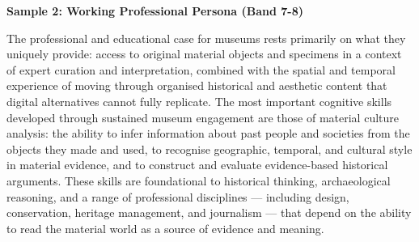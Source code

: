 \textbf{Sample 2: Working Professional Persona (Band 7-8)}

The professional and educational case for museums rests primarily on what they uniquely provide: access to original material objects and specimens in a context of expert curation and interpretation, combined with the spatial and temporal experience of moving through organised historical and aesthetic content that digital alternatives cannot fully replicate. The most important cognitive skills developed through sustained museum engagement are those of material culture analysis: the ability to infer information about past people and societies from the objects they made and used, to recognise geographic, temporal, and cultural style in material evidence, and to construct and evaluate evidence-based historical arguments. These skills are foundational to historical thinking, archaeological reasoning, and a range of professional disciplines — including design, conservation, heritage management, and journalism — that depend on the ability to read the material world as a source of evidence and meaning.

\separator


